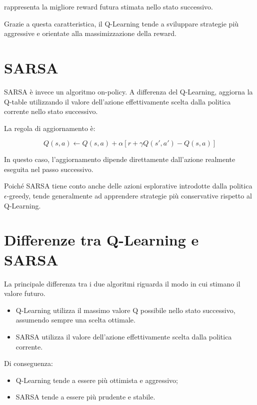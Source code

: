 \documentclass[12pt,a4paper]{report}
\begin{document}
rappresenta la migliore reward futura stimata nello stato successivo.

Grazie a questa caratteristica, il Q-Learning tende a sviluppare strategie più aggressive e orientate alla massimizzazione della reward.

\section{SARSA}

SARSA è invece un algoritmo on-policy. A differenza del Q-Learning, aggiorna la Q-table utilizzando il valore dell’azione effettivamente scelta dalla politica corrente nello stato successivo.

La regola di aggiornamento è:

\begin{equation}
Q(s,a) \leftarrow Q(s,a) +
\alpha \left[
r + \gamma Q(s',a') - Q(s,a)
\right]
\end{equation}

In questo caso, l’aggiornamento dipende direttamente dall’azione realmente eseguita nel passo successivo.

Poiché SARSA tiene conto anche delle azioni esplorative introdotte dalla politica $\epsilon$-greedy, tende generalmente ad apprendere strategie più conservative rispetto al Q-Learning.

\section{Differenze tra Q-Learning e SARSA}

La principale differenza tra i due algoritmi riguarda il modo in cui stimano il valore futuro.

\begin{itemize}
    \item Q-Learning utilizza il massimo valore Q possibile nello stato successivo, assumendo sempre una scelta ottimale.
    \item SARSA utilizza il valore dell’azione effettivamente scelta dalla politica corrente.
\end{itemize}

Di conseguenza:

\begin{itemize}
    \item Q-Learning tende a essere più ottimista e aggressivo;
    \item SARSA tende a essere più prudente e stabile.
\end{itemize}
\end{document}
